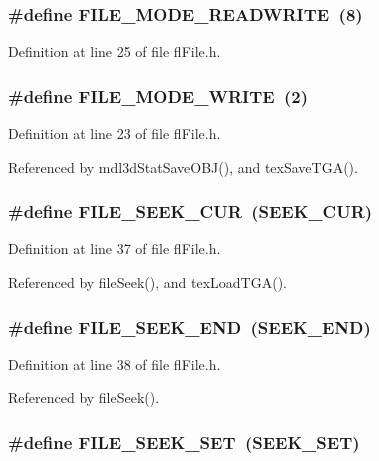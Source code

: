 \subsubsection{\setlength{\rightskip}{0pt plus 5cm}\#define FILE\_\-MODE\_\-READWRITE~(8)}\label{flFile_8h_32b1578a05f16f45b3d017fcd1d0eba1}




Definition at line 25 of file fl\-File.h.
\subsubsection{\setlength{\rightskip}{0pt plus 5cm}\#define FILE\_\-MODE\_\-WRITE~(2)}\label{flFile_8h_38868be632c78d78cffed793136025df}




Definition at line 23 of file fl\-File.h.

Referenced by mdl3d\-Stat\-Save\-OBJ(), and tex\-Save\-TGA().
\subsubsection{\setlength{\rightskip}{0pt plus 5cm}\#define FILE\_\-SEEK\_\-CUR~(SEEK\_\-CUR)}\label{flFile_8h_7c3bbd9732668a3188d931034a5f230b}




Definition at line 37 of file fl\-File.h.

Referenced by file\-Seek(), and tex\-Load\-TGA().
\subsubsection{\setlength{\rightskip}{0pt plus 5cm}\#define FILE\_\-SEEK\_\-END~(SEEK\_\-END)}\label{flFile_8h_3c580687c3aced8196380525e9532973}




Definition at line 38 of file fl\-File.h.

Referenced by file\-Seek().
\subsubsection{\setlength{\rightskip}{0pt plus 5cm}\#define FILE\_\-SEEK\_\-SET~(SEEK\_\-SET)}\label{flFile_8h_e2c4c68b8f9b63358f8c8f32b77ecb09}




